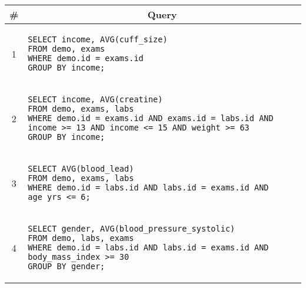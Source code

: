 \begin{tabular}{cl}
\toprule
\# & \multicolumn{1}{c}{Query} \\
\midrule
1 & 
\begin{minipage}{6in}
\begin{lstlisting}[breaklines]
SELECT income, AVG(cuff_size)
FROM demo, exams
WHERE demo.id = exams.id
GROUP BY income;
\end{lstlisting}
\end{minipage}{queryno} \label[query]{q1} \\
2 & 
\begin{minipage}{6in}
\begin{lstlisting}[breaklines]
SELECT income, AVG(creatine)
FROM demo, exams, labs
WHERE demo.id = exams.id AND exams.id = labs.id AND income >= 13 AND income <= 15 AND weight >= 63
GROUP BY income;
\end{lstlisting}
\end{minipage}
{queryno} \label[query]{q2} \\
3 & 
\begin{minipage}{6in}
\begin{lstlisting}[breaklines]
SELECT AVG(blood_lead)
FROM demo, exams, labs
WHERE demo.id = labs.id AND labs.id = exams.id AND age_yrs <= 6;
\end{lstlisting}
\end{minipage}{queryno} \label[query]{q3}\\
4 & 
\begin{minipage}{6in}
\begin{lstlisting}[breaklines]
SELECT gender, AVG(blood_pressure_systolic)
FROM demo, labs, exams
WHERE demo.id = labs.id AND labs.id = exams.id AND body_mass_index >= 30
GROUP BY gender;
\end{lstlisting}
\end{minipage}{queryno} \label[query]{q4}\\
\bottomrule
\end{tabular}


